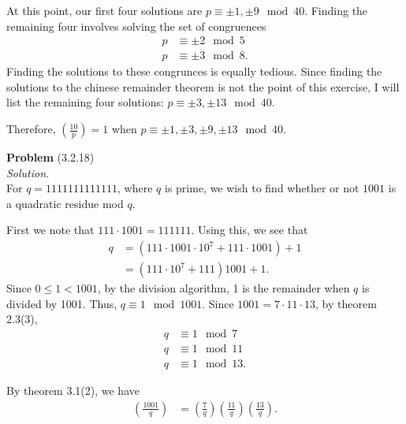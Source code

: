 \documentclass[12 pt]{amsart}
\begin{document}
  At this point, our first four solutions are
  $p \equiv \pm 1, \pm 9 \mod 40$. 
  Finding the remaining four involves solving the set
  of congruences
  \begin{align*}
    p &\equiv \pm 2 \mod 5 \\
    p &\equiv \pm 3 \mod 8.
  \end{align*}
  Finding the solutions to these congrunces is equally 
  tedious. 
  Since finding the solutions to the chinese remainder
  theorem is not the point of this exercise, I will 
  list the remaining four solutions:
  $p \equiv \pm 3, \pm 13 \mod 40$.

  Therefore, 
  $\left( \frac{10}{p} \right) = 1$ 
  when
  $p \equiv \pm 1, \pm 3, \pm 9, \pm 13 \mod 40$.
\vfill
\newpage



\phantom{\quad} \vfill
\noindent
\textbf{Problem} (3.2.18) \\[4ex]
\emph{Solution.} \\[2ex]
  For $q = 1111111111111$, where $q$ is prime, 
  we wish to find whether or not $1001$ is a 
  quadratic residue mod $q$.

  First we note that 
  $111 \cdot 1001 = 111111$.
  Using this, we see that
  \begin{align*}
    q &= 
    \left( 
          111 \cdot 1001 \cdot 10^7 
          +
          111 \cdot 1001 
    \right)
    + 1 \\
    &=
      (111 \cdot 10^7 + 111)1001 + 1.
  \end{align*}
  Since $0 \leq 1 < 1001$, by the division
  algorithm, 1 is the remainder when
  $q$ is divided by 1001.
  Thus, $q \equiv 1 \mod 1001$.
  Since $1001 = 7 \cdot 11 \cdot 13$,
  by theorem 2.3(3), 
  \begin{align}
    \label{eq:3.2.18.1}
    q &\equiv 1 \mod 7 \\
    \label{eq:3.2.18.2}
    q &\equiv 1 \mod 11 \\
    \label{eq:3.2.18.3}
    q &\equiv 1 \mod 13. 
  \end{align}
  
  By theorem 3.1(2), we have
  \begin{align*}
    \left( \frac{1001}{q} \right)
    &=
      \left( \frac{7}{q} \right)
      \left( \frac{11}{q} \right)
      \left( \frac{13}{q} \right).
  \end{align*}
\end{document}

